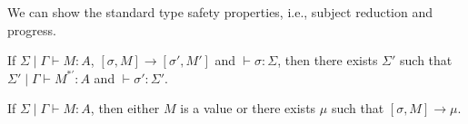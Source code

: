 We can show the standard type safety properties, i.e., subject reduction and progress.
\begin{thm}
  If $\Sigma\mid\Gamma \vdash M : A$, $[\sigma,M] \to [\sigma',M']$ and $\vdash \sigma : \Sigma$,
  then there exists $\Sigma'$ such that $\Sigma' \mid \Gamma \vdash M^{*'} : A$ and $\vdash \sigma' : \Sigma'$.
\end{thm}

\begin{thm}[Progress]
  If $\Sigma \mid \Gamma \vdash M : A$,
  then either $M$ is a value or there exists $\mu$ such that $[\sigma,M] \to \mu$.

\end{thm}

